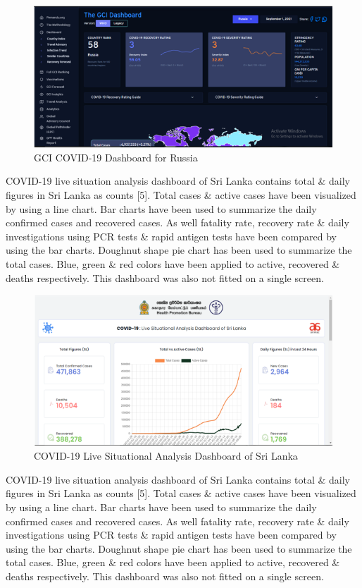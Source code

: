 \documentclass[
]{article}
\begin{document}
\begin{figure}
\includegraphics[width=8.25in]{Images/12} \caption{GCI COVID-19 Dashboard for Russia}\label{fig:unnamed-chunk-12}
\end{figure}

COVID-19 live situation analysis dashboard of Sri Lanka contains total
\& daily figures in Sri Lanka as counts {[}5{]}. Total cases \& active
cases have been visualized by using a line chart. Bar charts have been
used to summarize the daily confirmed cases and recovered cases. As well
fatality rate, recovery rate \& daily investigations using PCR tests \&
rapid antigen tests have been compared by using the bar charts. Doughnut
shape pie chart has been used to summarize the total cases. Blue, green
\& red colors have been applied to active, recovered \& deaths
respectively. This dashboard was also not fitted on a single screen.

\begin{figure}
\includegraphics[width=8.4in]{Images/13} \caption{COVID-19 Live Situational Analysis Dashboard of Sri Lanka}\label{fig:unnamed-chunk-13}
\end{figure}

COVID-19 live situation analysis dashboard of Sri Lanka contains total
\& daily figures in Sri Lanka as counts {[}5{]}. Total cases \& active
cases have been visualized by using a line chart. Bar charts have been
used to summarize the daily confirmed cases and recovered cases. As well
fatality rate, recovery rate \& daily investigations using PCR tests \&
rapid antigen tests have been compared by using the bar charts. Doughnut
shape pie chart has been used to summarize the total cases. Blue, green
\& red colors have been applied to active, recovered \& deaths
respectively. This dashboard was also not fitted on a single screen.
\end{document}
